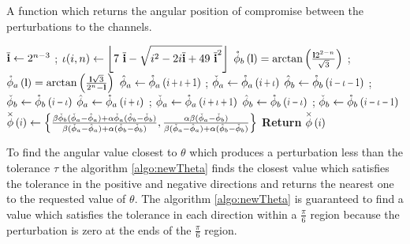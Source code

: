  \begin{algorithm}[h]\label{algo:thetaX}
  \caption{A function which returns the angular position of compromise between the perturbations to the channels.}
 \begin{algorithmic}
       
       \State $\overline{\mathbf{i}} \gets  2^{n-3}$  ; \quad  $\iota(i,n)  \gets  \left\lfloor 7\ \meanIndx-\sqrt{i^2 - 2 i \meanIndx + 49\ \meanIndx^2 }\right\rfloor $  
        \State $\extremaTheta{b}{\mathbf{l} } = \arctan\left(\frac{\mathbf{l} 2^{2-n}}{\sqrt{3}}       \right)$ ; \quad 
        $\extremaTheta{a}{\mathbf{l} } = \arctan\left(\frac{\mathbf{l} \sqrt{3} }{2^n - \mathbf{l}}\right)$
          
               \State   $\maximaTheta{a} \gets \extremaTheta{a}{i+\iota+1}  $ ;\quad
                 $\minimaTheta{a}  \gets \extremaTheta{a}{i+\iota} $ 
               \State   $\maximaTheta{b} \gets \extremaTheta{b}{i-\iota-1} $ ;\quad
                 $\minimaTheta{b}  \gets \extremaTheta{b}{i-\iota}  $
         \Else
                \State  $\maximaTheta{a}  \gets \extremaTheta{a}{i+\iota} $ ;\quad
                 $\minimaTheta{a}  \gets \extremaTheta{a}{i+\iota+1}  $ \;
                \State  $\maximaTheta{b} \gets \extremaTheta{b}{i-\iota}  $ ;\quad
                 $\minimaTheta{b}  \gets \extremaTheta{b} {i-\iota-1} $ \;
         \EndIf
       \State  $\thetaX{i} \gets \left\{\frac{
        \beta \minimaTheta{b} (\minimaTheta{a}  -\maximaTheta{a} )+\alpha  \minimaTheta{a} (\maximaTheta{b}-\minimaTheta{b})  }{
        \beta  (\minimaTheta{a} -\maximaTheta{a})+\alpha  (\maximaTheta{b}-\minimaTheta{b})
        },\frac{
        \alpha  \beta  (\minimaTheta{a}-\minimaTheta{b})  }{
        \beta  (\minimaTheta{a}-\maximaTheta{a})+\alpha  (\maximaTheta{b}-\minimaTheta{b})
        }\right\} $ \;
      \State \textbf{Return} {$\thetaX{i}$}
\EndFunction
 \end{algorithmic}
\end{algorithm}

To find the angular value closest to $\theta$ which produces a perturbation less than the tolerance $\tau$ the algorithm \ref{algo:newTheta} finds the closest value which satisfies the tolerance in the positive and negative directions and returns the nearest one to the requested value of $\theta$. The algorithm \ref{algo:newTheta} is guaranteed to find a value which satisfies the tolerance in each direction within a $\frac{\pi}{6}$ region because the perturbation is zero at the ends of the $\frac{\pi}{6}$ region.
 
